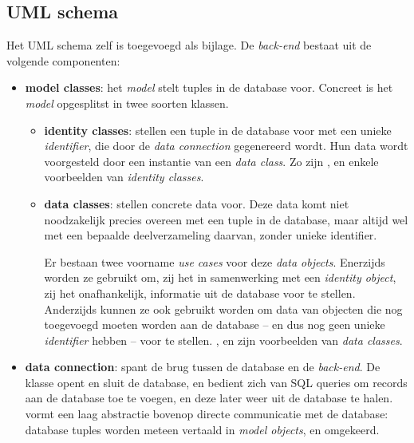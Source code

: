 \documentclass[12pt,a4paper]{article}
\begin{document}
\subsection{UML schema}

Het UML schema zelf is toegevoegd als bijlage. De \emph{back-end} bestaat uit de volgende componenten:

\begin{itemize}

\item \textbf{model classes}: het \emph{model} stelt tuples in de database voor. Concreet is het \emph{model} opgesplitst in twee soorten klassen.

\begin{itemize}

\item \textbf{identity classes}: stellen een tuple in de database voor met een unieke \emph{identifier}, die door de \emph{data connection} gegenereerd wordt. Hun data wordt voorgesteld door een instantie van een \emph{data class}. Zo zijn ,  en  enkele voorbeelden van \emph{identity classes}.

\item \textbf{data classes}: stellen concrete data voor. Deze data komt niet 
noodzakelijk precies overeen met een tuple in de database, maar altijd wel met 
een bepaalde deelverzameling daarvan, zonder unieke identifier.

Er bestaan twee voorname \emph{use cases} voor deze \emph{data objects}.
Enerzijds worden ze gebruikt om, zij het in samenwerking met een 
  \emph{identity object}, zij het onafhankelijk, informatie uit de database 
  voor te stellen.
Anderzijds kunnen ze ook gebruikt worden om data van objecten die nog 
  toegevoegd moeten worden aan de database -- en dus nog geen unieke 
  \emph{identifier} hebben -- voor te stellen. , 
   en  zijn voorbeelden van \emph{data 
  classes}.

\end{itemize}

\item \textbf{data connection}: spant de brug tussen de database en de \emph{back-end}. De  klasse opent en sluit de database, en bedient zich van SQL queries om records aan de database toe te voegen, en deze later weer uit de database te halen.  vormt een laag abstractie bovenop directe communicatie met de database: database tuples worden meteen vertaald in \emph{model objects}, en omgekeerd.


\end{itemize}
\end{document}

